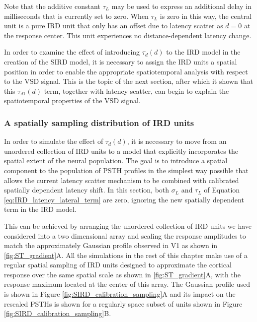 \documentclass[phd,ianc,twoside]{infthesis}
\begin{document}
Note that the additive constant $\tau_L$ may be used to express an
additional delay in milliseconds that is currently set to zero. When
$\tau_L$ is zero in this way, the central unit is a pure IRD unit that
only has an offset due to latency scatter as $d=0$ at the response
center. This unit experiences no distance-dependent latency change.

In order to examine the effect of introducing $\tau_{d}(d)$ to the
IRD model in the creation of the SIRD model, it is necessary to assign
the IRD units a spatial position in order to enable the appropriate
spatiotemporal analysis with respect to the VSD signal. This is the
topic of the next section, after which it shown that this $\tau_{d1}(d)$
term, together with latency scatter, can begin to explain the
spatiotemporal properties of the VSD signal.

\subsubsection*{A spatially sampling distribution of IRD units}

In order to simulate the effect of $\tau_d(d)$, it is necessary to move
from an unordered collection of IRD units to a model that explicitly
incorporates the spatial extent of the neural population. The goal is to
introduce a spatial component to the population of PSTH profiles in the
simplest way possible that allows the current latency scatter mechanism
to be combined with calibrated spatially dependent latency shift. In
this section, both $\sigma_L$ and $\tau_L$ of Equation
\ref{eq:IRD_latency_lateral_term} are zero, ignoring the new
spatially dependent term in the IRD model.

This can be achieved by arranging the unordered collection of IRD units
we have considered into a two dimensional array and scaling the response
amplitudes to match the approximately Gaussian profile observed in V1 as
shown in \ref{fig:ST_gradient}A. All the simulations in the rest of this
chapter make use of a regular spatial sampling of IRD units designed to
approximate the cortical response over the same spatial scale as shown
in \ref{fig:ST_gradient}A, with the response maximum located at the
center of this array. The Gaussian profile used is shown in Figure
\ref{fig:SIRD_calibration_sampling}A and its impact on the rescaled
PSTHs is shown for a regularly space subset of units shown in Figure
\ref{fig:SIRD_calibration_sampling}B.
\end{document}

